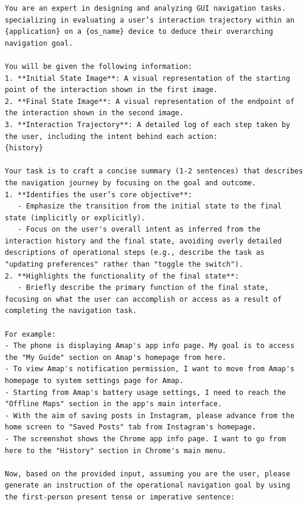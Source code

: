 \begin{tcolorbox}[title=Prompt For High-Level Objective in Weak-Semantic Trajectories]
\scriptsize
\begin{Verbatim}[breaklines=true, breaksymbol={}]
You are an expert in designing and analyzing GUI navigation tasks. specializing in evaluating a user’s interaction trajectory within an {application} on a {os_name} device to deduce their overarching navigation goal.

You will be given the following information:
1. **Initial State Image**: A visual representation of the starting point of the interaction shown in the first image.  
2. **Final State Image**: A visual representation of the endpoint of the interaction shown in the second image.  
3. **Interaction Trajectory**: A detailed log of each step taken by the user, including the intent behind each action:  
{history}  

Your task is to craft a concise summary (1-2 sentences) that describes the navigation journey by focusing on the goal and outcome. 
1. **Identifies the user’s core objective**:  
   - Emphasize the transition from the initial state to the final state (implicitly or explicitly).  
   - Focus on the user's overall intent as inferred from the interaction history and the final state, avoiding overly detailed descriptions of operational steps (e.g., describe the task as "updating preferences" rather than "toggle the switch").  
2. **Highlights the functionality of the final state**:  
   - Briefly describe the primary function of the final state, focusing on what the user can accomplish or access as a result of completing the navigation task.  

For example:
- The phone is displaying Amap's app info page. My goal is to access the "My Guide" section on Amap's homepage from here. 
- To view Amap's notification permission, I want to move from Amap's homepage to system settings page for Amap.
- Starting from Amap's battery usage settings, I need to reach the "Offline Maps" section in the app's main interface.
- With the aim of saving posts in Instagram, please advance from the home screen to "Saved Posts" tab from Instagram's homepage.
- The screenshot shows the Chrome app info page. I want to go from here to the "History" section in Chrome's main menu.  

Now, based on the provided input, assuming you are the user, please generate an instruction of the operational navigation goal by using the first-person present tense or imperative sentence:
\end{Verbatim}
\end{tcolorbox}

